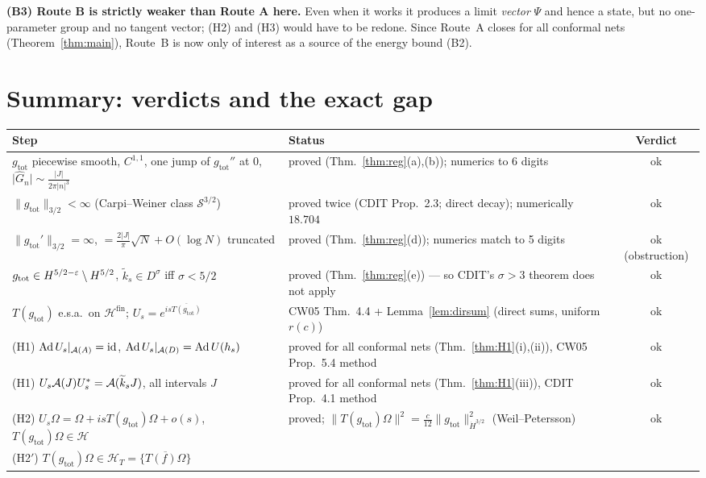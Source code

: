 \documentclass[11pt]{article}
\newcommand{\Om}{\Omega}
\newcommand{\Hil}{\mathcal H}
\newcommand{\norm}[1]{\lVert #1\rVert}
\newcommand{\abs}[1]{\lvert #1\rvert}
\newcommand{\gtot}{g_{\mathrm{tot}}}
\newcommand{\ktil}{\widetilde k}
\newcommand{\Hfin}{\Hil^{\mathrm{fin}}}
\newcommand{\Ad}{\operatorname{Ad}}
\begin{document}
\textbf{(B3) Route B is strictly weaker than Route A here.}  Even when it works it produces a limit \emph{vector}
$\Psi$ and hence a state, but no one-parameter group and no tangent vector; (H2) and (H3) would have to be redone.
Since Route~A closes for all conformal nets (Theorem~\ref{thm:main}), Route~B is now only of interest as a source of
the energy bound (B2).


\section{Summary: verdicts and the exact gap}\label{sec:summary}

\begin{center}\small
\begin{tabularx}{\textwidth}{>{\raggedright\arraybackslash}p{} >{\raggedright\arraybackslash}X c}\toprule
Step & Status & Verdict\\\midrule
$\gtot$ piecewise smooth, $C^{1,1}$, one jump of $\gtot''$ at $0$, $\abs{\hat G_n}\sim\frac{\abs J}{2\pi\abs n^3}$
 & proved (Thm.~\ref{thm:reg}(a),(b)); numerics to 6 digits & ok\\
$\norm{\gtot}_{3/2}<\infty$ (Carpi--Weiner class $\mathcal S^{3/2}$)
 & proved twice (CDIT Prop.~2.3; direct decay); numerically $18.704$ & ok\\
$\norm{\gtot'}_{3/2}=\infty$, $=\frac{2\abs J}\pi\sqrt N+O(\log N)$ truncated
 & proved (Thm.~\ref{thm:reg}(d)); numerics match to 5 digits & ok (obstruction)\\
$\gtot\in H^{5/2-\eps}\setminus H^{5/2}$, $\ktil_s\in D^\sigma$ iff $\sigma<5/2$
 & proved (Thm.~\ref{thm:reg}(e)) --- so CDIT's $\sigma>3$ theorem does not apply & ok\\
$T(\gtot)$ e.s.a.\ on $\Hfin$; $U_s=e^{is\overline{T(\gtot)}}$
 & CW05 Thm.~4.4 + Lemma~\ref{lem:dirsum} (direct sums, uniform $r(c)$) & ok\\
(H1) $\Ad U_s|_{\cA(A)}=\mathrm{id}$, $\Ad U_s|_{\cA(D)}=\Ad U(h_s)$
 & proved for all conformal nets (Thm.~\ref{thm:H1}(i),(ii)), CW05 Prop.~5.4 method & ok\\
(H1) $U_s\cA(J)U_s^*=\cA(\ktil_sJ)$, all intervals $J$
 & proved for all conformal nets (Thm.~\ref{thm:H1}(iii)), CDIT Prop.~4.1 method & ok\\
(H2) $U_s\Om=\Om+isT(\gtot)\Om+o(s)$, $T(\gtot)\Om\in\Hil$
 & proved; $\norm{T(\gtot)\Om}^2=\frac c{12}\norm{\gtot}^2_{\dot H^{3/2}}$ (Weil--Petersson) & ok\\
(H2$'$) $T(\gtot)\Om\in\Hil_T=\overline{\{T(f)\Om\}}$

\end{tabularx}
\end{center}
\end{document}
